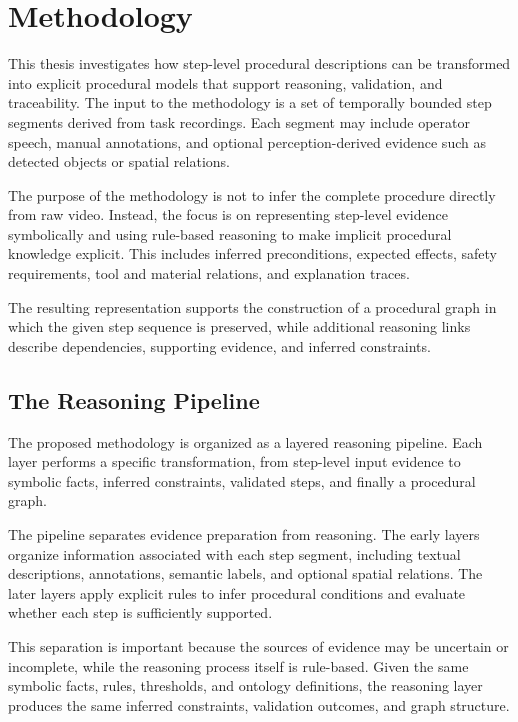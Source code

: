 \chapter{Methodology}
\label{cha:methodology}

This thesis investigates how step-level procedural descriptions can be transformed into explicit procedural models that support reasoning, validation, and traceability. The input to the methodology is a set of temporally bounded step segments derived from task recordings. Each segment may include operator speech, manual annotations, and optional perception-derived evidence such as detected objects or spatial relations.

The purpose of the methodology is not to infer the complete procedure directly from raw video. Instead, the focus is on representing step-level evidence symbolically and using rule-based reasoning to make implicit procedural knowledge explicit. This includes inferred preconditions, expected effects, safety requirements, tool and material relations, and explanation traces.

The resulting representation supports the construction of a procedural graph in which the given step sequence is preserved, while additional reasoning links describe dependencies, supporting evidence, and inferred constraints.

\section{The Reasoning Pipeline}
\label{sec:method-reasoning-pipeline}

The proposed methodology is organized as a layered reasoning pipeline. Each layer performs a specific transformation, from step-level input evidence to symbolic facts, inferred constraints, validated steps, and finally a procedural graph.

The pipeline separates evidence preparation from reasoning. The early layers organize information associated with each step segment, including textual descriptions, annotations, semantic labels, and optional spatial relations. The later layers apply explicit rules to infer procedural conditions and evaluate whether each step is sufficiently supported.

This separation is important because the sources of evidence may be uncertain or incomplete, while the reasoning process itself is rule-based. Given the same symbolic facts, rules, thresholds, and ontology definitions, the reasoning layer produces the same inferred constraints, validation outcomes, and graph structure.

